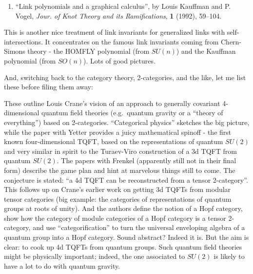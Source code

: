 \documentclass{article}
\def\tightlist{}
\renewcommand{\texttt}[1]{%
  \begingroup
  \ttfamily
  \begingroup\lccode`~=`/\lowercase{\endgroup\def~}{/\discretionary{}{}{}}%
  \begingroup\lccode`~=`[\lowercase{\endgroup\def~}{[\discretionary{}{}{}}%
  \begingroup\lccode`~=`.\lowercase{\endgroup\def~}{.\discretionary{}{}{}}%
  \catcode`/=\active\catcode`[=\active\catcode`.=\active
  \scantokens{#1\noexpand}%
  \endgroup
}
\begin{document}
\begin{enumerate}
\def\labelenumi{\arabic{enumi})}
\setcounter{enumi}{2}
\tightlist
\item
  ``Link polynomials and a graphical calculus'', by Louis Kauffman and
  P. Vogel, \emph{Jour. of Knot Theory and its Ramifications},
  \textbf{1} (1992), 59--104.
\end{enumerate}

This is another nice treatment of link invariants for generalized links
with self-intersections. It concentrates on the famous link invariants
coming from Chern-Simons theory - the HOMFLY polynomial (from \(SU(n)\))
and the Kauffman polynomial (from \(SO(n)\)). Lots of good pictures.

And, switching back to the category theory, 2-categories, and the like,
let me list these before filing them away:


These outline Louis Crane's vision of an approach to generally covariant
4-dimensional quantum field theories (e.g.~quantum gravity or a ``theory
of everything'') based on 2-categories. ``Categorical physics'' sketches
the big picture, while the paper with Yetter provides a juicy
mathematical spinoff - the first known four-dimensional TQFT, based on
the representations of quantum \(SU(2)\) and very similar in spirit to
the Turaev-Viro construction of a 3d TQFT from quantum \(SU(2)\). The
papers with Frenkel (apparently still not in their final form) describe
the game plan and hint at marvelous things still to come. The conjecture
is stated: ``a 4d TQFT can be reconstructed from a tensor 2-category''.
This follows up on Crane's earlier work on getting 3d TQFTs from modular
tensor categories (big example: the categories of representations of
quantum groups at roots of unity). And the authors define the notion of
a Hopf category, show how the category of module categories of a Hopf
category is a tensor 2-category, and use ``categorification'' to turn
the universal enveloping algebra of a quantum group into a Hopf
category. Sound abstract? Indeed it is. But the aim is clear: to cook up
4d TQFTs from quantum groups. Such quantum field theories might be
physically important; indeed, the one associated to \(SU(2)\) is likely
to have a lot to do with quantum gravity.
\end{document}
